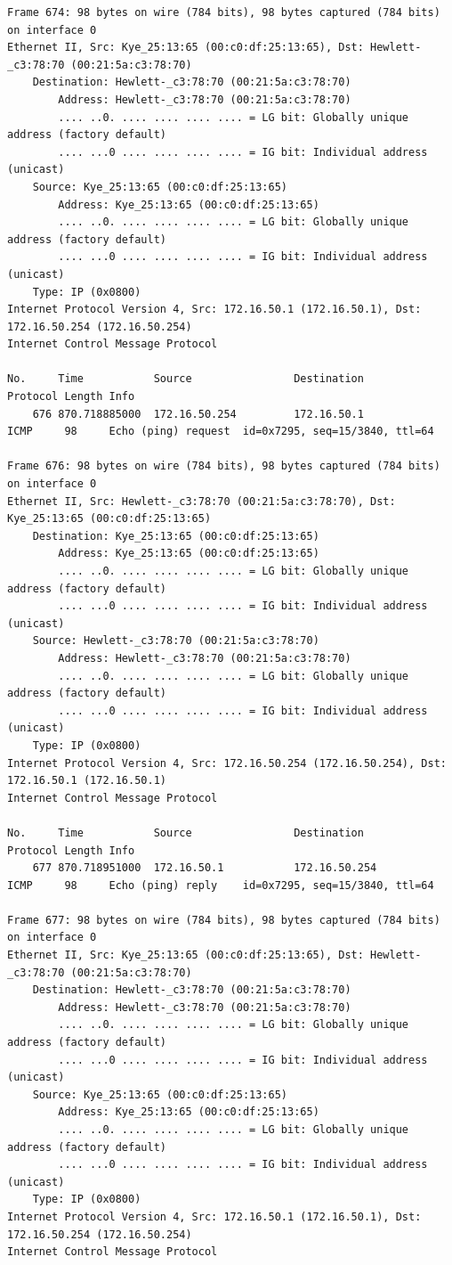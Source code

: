 \documentclass[a4paper,11pt]{article}
\begin{document}
\begin{lstlisting}
Frame 674: 98 bytes on wire (784 bits), 98 bytes captured (784 bits) on interface 0
Ethernet II, Src: Kye_25:13:65 (00:c0:df:25:13:65), Dst: Hewlett-_c3:78:70 (00:21:5a:c3:78:70)
    Destination: Hewlett-_c3:78:70 (00:21:5a:c3:78:70)
        Address: Hewlett-_c3:78:70 (00:21:5a:c3:78:70)
        .... ..0. .... .... .... .... = LG bit: Globally unique address (factory default)
        .... ...0 .... .... .... .... = IG bit: Individual address (unicast)
    Source: Kye_25:13:65 (00:c0:df:25:13:65)
        Address: Kye_25:13:65 (00:c0:df:25:13:65)
        .... ..0. .... .... .... .... = LG bit: Globally unique address (factory default)
        .... ...0 .... .... .... .... = IG bit: Individual address (unicast)
    Type: IP (0x0800)
Internet Protocol Version 4, Src: 172.16.50.1 (172.16.50.1), Dst: 172.16.50.254 (172.16.50.254)
Internet Control Message Protocol

No.     Time           Source                Destination           Protocol Length Info
    676 870.718885000  172.16.50.254         172.16.50.1           ICMP     98     Echo (ping) request  id=0x7295, seq=15/3840, ttl=64

Frame 676: 98 bytes on wire (784 bits), 98 bytes captured (784 bits) on interface 0
Ethernet II, Src: Hewlett-_c3:78:70 (00:21:5a:c3:78:70), Dst: Kye_25:13:65 (00:c0:df:25:13:65)
    Destination: Kye_25:13:65 (00:c0:df:25:13:65)
        Address: Kye_25:13:65 (00:c0:df:25:13:65)
        .... ..0. .... .... .... .... = LG bit: Globally unique address (factory default)
        .... ...0 .... .... .... .... = IG bit: Individual address (unicast)
    Source: Hewlett-_c3:78:70 (00:21:5a:c3:78:70)
        Address: Hewlett-_c3:78:70 (00:21:5a:c3:78:70)
        .... ..0. .... .... .... .... = LG bit: Globally unique address (factory default)
        .... ...0 .... .... .... .... = IG bit: Individual address (unicast)
    Type: IP (0x0800)
Internet Protocol Version 4, Src: 172.16.50.254 (172.16.50.254), Dst: 172.16.50.1 (172.16.50.1)
Internet Control Message Protocol

No.     Time           Source                Destination           Protocol Length Info
    677 870.718951000  172.16.50.1           172.16.50.254         ICMP     98     Echo (ping) reply    id=0x7295, seq=15/3840, ttl=64

Frame 677: 98 bytes on wire (784 bits), 98 bytes captured (784 bits) on interface 0
Ethernet II, Src: Kye_25:13:65 (00:c0:df:25:13:65), Dst: Hewlett-_c3:78:70 (00:21:5a:c3:78:70)
    Destination: Hewlett-_c3:78:70 (00:21:5a:c3:78:70)
        Address: Hewlett-_c3:78:70 (00:21:5a:c3:78:70)
        .... ..0. .... .... .... .... = LG bit: Globally unique address (factory default)
        .... ...0 .... .... .... .... = IG bit: Individual address (unicast)
    Source: Kye_25:13:65 (00:c0:df:25:13:65)
        Address: Kye_25:13:65 (00:c0:df:25:13:65)
        .... ..0. .... .... .... .... = LG bit: Globally unique address (factory default)
        .... ...0 .... .... .... .... = IG bit: Individual address (unicast)
    Type: IP (0x0800)
Internet Protocol Version 4, Src: 172.16.50.1 (172.16.50.1), Dst: 172.16.50.254 (172.16.50.254)
Internet Control Message Protocol


\end{lstlisting}
\end{document}
